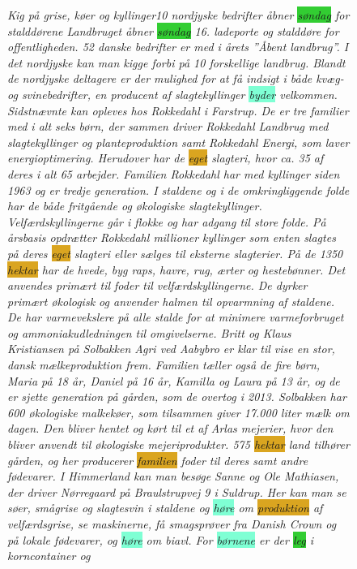 \begin{figure}[h]
	\begin{tcolorbox}[boxsep=5pt, top=0pt, bottom=0pt, left=0pt, right=0pt]
		\emph{
			Kig på grise, køer og kyllinger10 \colorbox{Peach}{nordjyske} bedrifter åbner \colorbox{LimeGreen}{søndag} for stalddørene Landbruget åbner \colorbox{LimeGreen}{søndag} 16.  ladeporte og stalddøre for offentligheden. 52 danske bedrifter er med i årets ”Åbent landbrug”. I det \colorbox{Peach}{nordjyske} kan man kigge forbi på 10 \colorbox{Peach}{forskellige} landbrug. Blandt de \colorbox{Peach}{nordjyske} deltagere er der \colorbox{Peach}{mulighed} for at få indsigt i både kvæg- og svinebedrifter,  en producent af slagtekyllinger \colorbox{Aquamarine}{byder} velkommen. Sidstnævnte kan opleves hos Rokkedahl i Farstrup. De er tre familier med i alt \colorbox{Peach}{seks} børn, der sammen driver Rokkedahl Landbrug med slagtekyllinger og planteproduktion \colorbox{Peach}{samt} Rokkedahl Energi, som laver energioptimering. Herudover har de \colorbox{Goldenrod}{eget} slagteri, hvor ca. 35 af deres i alt 65  arbejder. Familien Rokkedahl har  med kyllinger siden 1963 og er tredje generation. I staldene og i de omkringliggende folde har de både fritgående og økologiske slagtekyllinger. Velfærdskyllingerne går i flokke og har adgang til store folde. På årsbasis opdrætter Rokkedahl  \colorbox{Peach}{millioner} kyllinger som enten slagtes på deres \colorbox{Goldenrod}{eget} slagteri eller sælges til eksterne slagterier. På de 1350 \colorbox{Goldenrod}{hektar} har de hvede, byg raps, havre, rug, ærter og hestebønner. Det anvendes primært til foder til velfærdskyllingerne. De dyrker  primært økologisk og anvender halmen til opvarmning af staldene. De har varmevekslere på alle stalde for at minimere varmeforbruget og ammoniakudledningen til omgivelserne. Britt og Klaus Kristiansen på Solbakken Agri ved Aabybro er \colorbox{Peach}{klar} til vise en stor, \colorbox{Peach}{dansk} mælkeproduktion frem. Familien tæller også de fire børn, Maria på 18 år, Daniel på 16 år, Kamilla og Laura på 13 år, og de er sjette generation på gården, som de overtog i 2013. Solbakken har 600 økologiske malkekøer, som tilsammen \colorbox{Peach}{giver} 17.000 liter mælk om dagen. Den bliver hentet og kørt til et af Arlas mejerier, hvor den bliver anvendt til økologiske mejeriprodukter. 575 \colorbox{Goldenrod}{hektar} \colorbox{Peach}{land} tilhører gården, og her producerer \colorbox{Goldenrod}{familien} foder til deres  \colorbox{Peach}{samt} andre fødevarer.  I Himmerland kan man besøge Sanne og Ole Mathiasen, der driver Nørregaard på Braulstrupvej 9 i Suldrup. Her kan man se søer, smågrise og slagtesvin i staldene og \colorbox{Aquamarine}{høre} om \colorbox{Goldenrod}{produktion} af velfærdsgrise, se maskinerne, få smagsprøver fra Danish Crown og på \colorbox{Peach}{lokale} fødevarer, og \colorbox{Aquamarine}{høre} om biavl. For \colorbox{Aquamarine}{børnene} er der \colorbox{LimeGreen}{leg} i korncontainer og }
\end{tcolorbox}
\end{figure}
